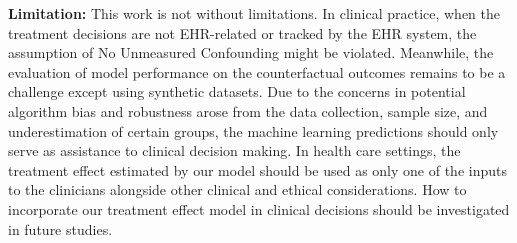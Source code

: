 \textbf{Limitation:}
This work is not without limitations. In clinical practice, when the treatment decisions are not EHR-related or tracked by the EHR system, the assumption of No Unmeasured Confounding might be violated. Meanwhile, the evaluation of model performance on the counterfactual outcomes remains to be a challenge except using synthetic datasets. Due to the concerns in potential algorithm bias and robustness arose from the data collection, sample size, and underestimation of certain groups, the machine learning predictions should only serve as assistance to clinical decision making.  In health care settings, the treatment effect estimated by our model should be used as only one of the inputs to the clinicians alongside other clinical and ethical considerations. How to incorporate our treatment effect model in clinical decisions should be investigated in future studies.
